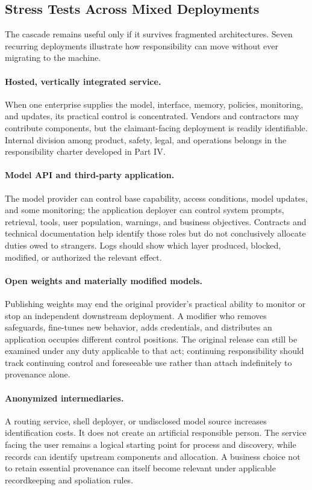 \subsection{Stress Tests Across Mixed Deployments}

The cascade remains useful only if it survives fragmented architectures. Seven recurring deployments illustrate how responsibility can move without ever migrating to the machine.

\paragraph{Hosted, vertically integrated service.}
When one enterprise supplies the model, interface, memory, policies, monitoring, and updates, its practical control is concentrated. Vendors and contractors may contribute components, but the claimant-facing deployment is readily identifiable. Internal division among product, safety, legal, and operations belongs in the responsibility charter developed in Part IV.

\paragraph{Model API and third-party application.}
The model provider can control base capability, access conditions, model updates, and some monitoring; the application deployer can control system prompts, retrieval, tools, user population, warnings, and business objectives. Contracts and technical documentation help identify those roles but do not conclusively allocate duties owed to strangers. Logs should show which layer produced, blocked, modified, or authorized the relevant effect.

\paragraph{Open weights and materially modified models.}
Publishing weights may end the original provider's practical ability to monitor or stop an independent downstream deployment. A modifier who removes safeguards, fine-tunes new behavior, adds credentials, and distributes an application occupies different control positions. The original release can still be examined under any duty applicable to that act; continuing responsibility should track continuing control and foreseeable use rather than attach indefinitely to provenance alone.

\paragraph{Anonymized intermediaries.}
A routing service, shell deployer, or undisclosed model source increases identification costs. It does not create an artificial responsible person. The service facing the user remains a logical starting point for process and discovery, while records can identify upstream components and allocation. A business choice not to retain essential provenance can itself become relevant under applicable recordkeeping and spoliation rules.

